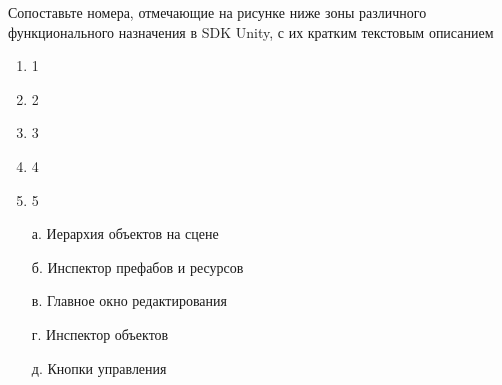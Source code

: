 

Сопоставьте номера, отмечающие на рисунке ниже зоны различного функционального назначения в SDK Unity, с их кратким текстовым описанием

\begin{multicols}{2}
    {
        \begin{enumerate}
            \item 1
            \item 2
            \item 3
            \item 4
            \item 5
        \end{enumerate}
    }    
    {
        \begin{enumerate}
            \item[а.] Иерархия объектов на сцене
            \item[б.] Инспектор префабов и ресурсов
            \item[в.] Главное окно редактирования
            \item[г.] Инспектор объектов
            \item[д.] Кнопки управления 
        \end{enumerate}
    }
\end{multicols}